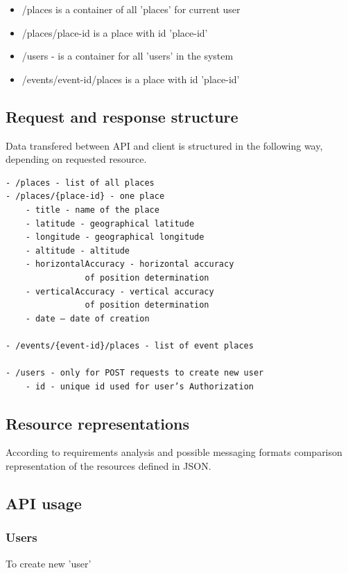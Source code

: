 \documentclass[thesis=M,english]{FITthesis}[2012/10/20]
\begin{document}
\begin{itemize}
	\item /places is a container of all 'places' for current user
	\item /places/{place-id} is a place with id 'place-id'
	\item /users - is a container for all 'users' in the system
	\item /events/{event-id}/places is a place with id 'place-id'
\end{itemize}

\subsection{Request and response structure}
\label{sec:reqstructure}

Data transfered between API and client is structured in the following way, depending on requested resource.

\begin{lstlisting}
- /places - list of all places
- /places/{place-id} - one place
	- title - name of the place
	- latitude - geographical latitude
	- longitude - geographical longitude
	- altitude - altitude 
	- horizontalAccuracy - horizontal accuracy 
				of position determination 
	- verticalAccuracy - vertical accuracy
				of position determination
	- date — date of creation 

- /events/{event-id}/places - list of event places

- /users - only for POST requests to create new user
	- id - unique id used for user’s Authorization
\end{lstlisting}

\subsection{Resource representations}
According to requirements analysis and possible messaging formats comparison representation of the resources defined in JSON.

\subsection{API usage}

\subsubsection{Users}

To create new 'user'
\end{document}
